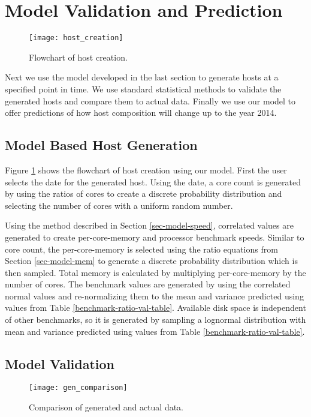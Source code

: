 \documentclass[conference]{IEEEtran}
\begin{document}
\section{Model Validation and Prediction}
\label{sec-res-predict}

\begin{figure}[!t]
\centering
\texttt{[image: host\_creation]}
\caption{Flowchart of host creation.}
\label{fig-host-creation}
\end{figure}

Next we use the model developed in the last section to generate hosts at a specified point in time.  We use standard statistical methods to validate the generated hosts and compare them to actual data.  Finally we use our model to offer predictions of how host composition will change up to the year 2014.

\subsection{Model Based Host Generation}
Figure \ref{fig-host-creation} shows the flowchart of host creation using our model.  First the user selects the date for the generated host.  Using the date, a core count is generated by using the ratios of cores to create a discrete probability distribution and selecting the number of cores with a uniform random number.

Using the method described in Section \ref{sec-model-speed}, correlated values are generated to create per-core-memory and processor benchmark speeds.  Similar to core count, the per-core-memory is selected using the ratio equations from Section \ref{sec-model-mem} to generate a discrete probability distribution which is then sampled.  Total memory is calculated by multiplying per-core-memory by the number of cores.  The benchmark values are generated by using the correlated normal values and re-normalizing them to the mean and variance predicted using values from Table \ref{benchmark-ratio-val-table}.  Available disk space is independent of other benchmarks, so it is generated by sampling a lognormal distribution with mean and variance predicted using values from Table \ref{benchmark-ratio-val-table}.

\subsection{Model Validation}

\begin{figure*}[!t]
\centering
\texttt{[image: gen\_comparison]}
\caption{Comparison of generated and actual data.}
\label{fig-gen-real-comparison}
\end{figure*}
\end{document}
